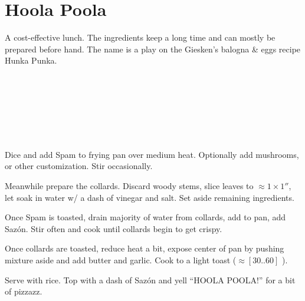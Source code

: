 \section{Hoola Poola}


\begin{recipestats}[
	servings=1 person,
	preptime=10 \minute,
	bakingtime=20 \minute,
	source=Mike,
	]
\end{recipestats}


\begin{recipeabstract}
	A cost-effective lunch.
	The ingredients keep a long time and can mostly be prepared before hand.
	The name is a play on the Giesken's balogna \& eggs recipe Hunka Punka. %
\end{recipeabstract}


\begin{ingredientcolumns}
	\begin{ingredientblock}
		\\
		\\
		\\
	\end{ingredientblock}
	\begin{ingredientblock}
		\ingredient[\approx~\onehalf][\teaspoon]{saz\'on}\\
		\ingredient[1][\Tablespoon]{butter}\\
		\ingredient[\onehalf][\Tablespoon]{garlic, minced}
	\end{ingredientblock}
\end{ingredientcolumns}


\begin{preparation}
\item Dice and add Spam to frying pan over medium heat.
	Optionally add mushrooms, or other customization.
	Stir occasionally.

\item Meanwhile prepare the collards.
	Discard woody stems, slice leaves to $\approx1\times1''$, let soak in water w/ a dash of vinegar and salt.
	Set aside remaining ingredients.

\item Once Spam is toasted, drain majority of water from collards, add to pan, add Saz\'on.
	Stir often and cook until collards begin to get crispy.

\item Once collards are toasted, reduce heat a bit, expose center of pan by pushing mixture aside and add butter and garlic.
	Cook to a light toast ($\approx[30..60]$ \second).

\item Serve with rice.
	Top with a dash of Saz\'on and yell ``HOOLA POOLA!'' for a bit of pizzazz.
\end{preparation}


\recipeend%
